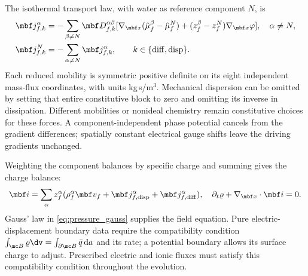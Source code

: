 \documentclass[11pt]{article}
\begin{document}
The isothermal transport law, with water as reference component \(N\), is
\begin{align}
 \mbf j_{f,k}^\alpha&=-\sum_{\beta\ne N}\mbf D_{f,k}^{\alpha\beta}
 [\nabla_{\mbf x}(\hat\mu_f^\beta-\hat\mu_f^N)
 +(z_f^\beta-z_f^N)\nabla_{\mbf x}\varphi],\quad\alpha\ne N,\notag\\
 \mbf j_{f,k}^N&=-\sum_{\alpha\ne N}\mbf j_{f,k}^\alpha,
 \qquad k\in\{{\rm diff},{\rm disp}\}.
 \label{eq:relative_transport}
\end{align}
Each reduced mobility is symmetric positive definite on its eight independent mass-flux coordinates, with units kg\,s/m\(^3\). Mechanical dispersion can be omitted by setting that entire constitutive block to zero and omitting its inverse in dissipation. Different mobilities or nonideal chemistry remain constitutive choices for these forces. A component-independent phase potential cancels from the gradient differences; spatially constant electrical gauge shifts leave the driving gradients unchanged.

Weighting the component balances by specific charge and summing gives the charge balance:
\begin{equation}
 \mbf i=\sum_\alpha z_f^\alpha
 (\rho_f^\alpha\mbf v_f+\mbf j_{f,{\rm disp}}^\alpha+\mbf j_{f,{\rm diff}}^\alpha),
 \quad \partial_t\varrho+\nabla_{\mbf x}\cdot\mbf i=0.
 \label{eq:charge_balance}
\end{equation}
Gauss’ law in \eqref{eq:pressure_gauss} supplies the field equation. Pure electric-displacement boundary data require the compatibility condition \(\int_{\mc B}\varrho\dv=\int_{\partial\mc B}\bar q\,{\rm d}a\) and its rate; a potential boundary allows its surface charge to adjust. Prescribed electric and ionic fluxes must satisfy this compatibility condition throughout the evolution.
\end{document}
